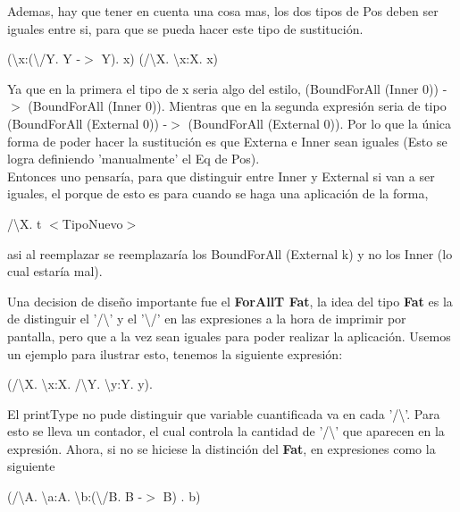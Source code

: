 \documentclass[12pt, titlepage, a4paper]{article}
\begin{document}
\begin{itemize}[label=$\bullet$]
{  Ademas, hay que tener en cuenta una cosa mas, los dos tipos de Pos deben ser iguales entre si, para que se pueda hacer este tipo 
  de sustitución.
  
  \begin{center}
    (\textbackslash x:(\textbackslash/Y. Y -$>$ Y). x) (/\textbackslash X. \textbackslash x:X. x)
  \end{center} 

  Ya que en la primera el tipo de x seria algo del estilo, (BoundForAll (Inner 0)) -$>$ (BoundForAll (Inner 0)). Mientras que en la segunda expresión seria 
  de tipo (BoundForAll (External 0)) -$>$ (BoundForAll (External 0)). Por lo que la única forma de poder hacer la sustitución es que Externa e Inner sean iguales (Esto 
  se logra definiendo 'manualmente' el Eq de Pos). \\
  Entonces uno pensaría, para que distinguir entre Inner y External si van a ser iguales, el porque de esto es para cuando se haga una aplicación de la forma,
  \begin{center}
    /\textbackslash X. t $<$TipoNuevo$>$
  \end{center} 
   asi al reemplazar se reemplazaría los BoundForAll (External k) y no los Inner (lo cual estaría mal).
  }

  \end{itemize}

  Una decision de diseño importante fue el \textbf{ForAllT Fat}, la idea del tipo \textbf{Fat} es la de distinguir el '/\textbackslash' y el '\textbackslash /' 
  en las expresiones a la hora de imprimir por pantalla, pero que a la vez sean iguales para poder realizar la aplicación. Usemos un ejemplo para ilustrar esto, 
  tenemos la siguiente expresión:

  \begin{center}
    (/\textbackslash X. \textbackslash x:X. /\textbackslash Y. \textbackslash y:Y. y).
  \end{center} 

  El printType no pude distinguir que variable cuantificada va en cada '/\textbackslash'. Para esto se lleva un contador, el cual controla la cantidad de 
  '/\textbackslash' que aparecen en la expresión. Ahora, si no se hiciese la distinción del \textbf{Fat}, en expresiones como la siguiente 

  \begin{center}
    (/\textbackslash A. \textbackslash a:A. \textbackslash b:(\textbackslash/B. B -$>$ B) . b)
  \end{center}  
\end{document}
